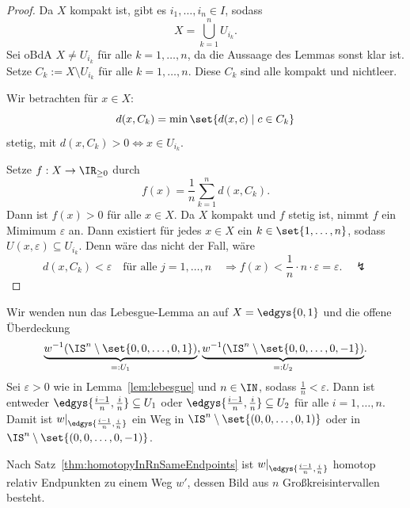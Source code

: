 \documentclass[language=ngerman]{TemplateLecture} %
\begin{document}
\begin{proof}
    Da $X$ kompakt ist, gibt es $i_1,\ldots,i_n \in I$, sodass
    \begin{equation*}
        X = \bigcup_{k = 1}^n U_{i_k}.
    \end{equation*}
    Sei oBdA $X \neq U_{i_k}$ für alle $k = 1,\ldots,n$, da die Aussaage des Lemmas sonst klar ist. Setze $C_k := X \setminus U_{i_k}$ für alle $k = 1, \ldots, n$. Diese $C_k$ sind alle kompakt und nichtleer. 

    Wir betrachten für $x \in X$:
    \begin{equation*}
        d(x, C_k) = \min\set{d(x,c) \mid c \in C_k}
    \end{equation*}
    stetig, mit $d(x, C_k) > 0 \Leftrightarrow x \in U_{i_k}$.

    Setze $f: X \to \IR_{\geq 0}$ durch 
    \begin{equation*}
        f(x) = \frac{1}{n} \sum_{k = 1}^n d(x, C_k).
    \end{equation*}
    Dann ist $f(x) > 0$ für alle $x \in X$. Da $X$ kompakt und $f$ stetig ist, nimmt $f$ ein Mimimum $\varepsilon$ an. Dann existiert für jedes $x \in X$ ein $k \in \set{1, \ldots, n}$, sodass $U(x, \varepsilon) \subseteq U_{i_k}$. Denn wäre das nicht der Fall, wäre 
    \begin{equation*}
        d(x, C_k) < \varepsilon \quad \text{für alle $j = 1, \ldots, n$} \quad \Rightarrow f(x) < \frac{1}{n} \cdot n \cdot \varepsilon = \varepsilon. \quad \lightning
    \end{equation*}
\end{proof}

Wir wenden nun das Lebesgue-Lemma an auf $X = \edgys{0,1}$ und die offene Überdeckung
\begin{equation*}
    \underset{=:U_1}{\underbrace{w^{-1}(\IS^n \setminus \set{0,0,\ldots,0,1})}}, \underset{=:U_2}{\underbrace{w^{-1}(\IS^n \setminus \set{0,0,\ldots,0,-1})}}.
\end{equation*}
Sei $\varepsilon > 0$ wie in Lemma~\ref{lem:lebesgue} und $n \in \IN$, sodass $\frac{1}{n} < \varepsilon$. Dann ist entweder $\edgys{\frac{i-1}{n}, \frac{i}{n}} \subseteq U_1$ oder $\edgys{\frac{i-1}{n}, \frac{i}{n}} \subseteq U_2$ für alle $i=1, \ldots, n$. Damit ist $w|_{\edgys{\frac{i-1}{n}, \frac{i}{n}}}$ ein Weg in $\IS^n \setminus \set{(0,0,\ldots,0,1)}$ oder in $\IS^n \setminus \set{(0,0,\ldots,0,-1)}$.

Nach Satz~\ref{thm:homotopyInRnSameEndpoints} ist $w|_{\edgys{\frac{i-1}{n},\frac{i}{n}}}$ homotop relativ Endpunkten zu einem Weg $w'$, dessen Bild aus $n$ Großkreisintervallen besteht.
\end{document}
